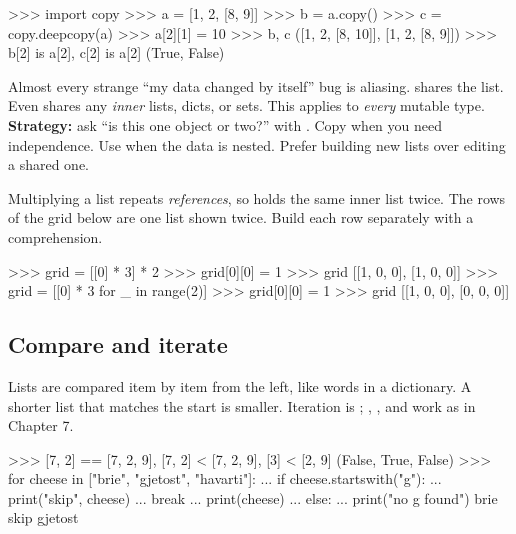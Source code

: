 \begin{pycode}
>>> import copy
>>> a = [1, 2, [8, 9]]
>>> b = a.copy()
>>> c = copy.deepcopy(a)
>>> a[2][1] = 10
>>> b, c
([1, 2, [8, 10]], [1, 2, [8, 9]])
>>> b[2] is a[2], c[2] is a[2]
(True, False)
\end{pycode}

\begin{boss}
Almost every strange ``my data changed by itself'' bug is aliasing.  shares the list. Even
 shares any \emph{inner} lists, dicts, or sets. This applies to \emph{every} mutable type.\\[2pt]
\textbf{Strategy:} ask ``is this one object or two?'' with . Copy when you need independence. Use
 when the data is nested. Prefer building new lists over editing a shared one.
\end{boss}

\begin{trap}
Multiplying a list repeats \emph{references}, so  holds the same inner list twice. The rows of the grid below are one list shown twice. Build
each row separately with a comprehension.
\end{trap}

\begin{pycode}
>>> grid = [[0] * 3] * 2
>>> grid[0][0] = 1
>>> grid
[[1, 0, 0], [1, 0, 0]]
>>> grid = [[0] * 3 for _ in range(2)]
>>> grid[0][0] = 1
>>> grid
[[1, 0, 0], [0, 0, 0]]
\end{pycode}

\subsection{Compare and iterate}

Lists are compared item by item from the left, like words in a dictionary. A shorter list that matches
the start is smaller. Iteration is ; , , and 
work as in Chapter 7.

\begin{pycode}
>>> [7, 2] == [7, 2, 9], [7, 2] < [7, 2, 9], [3] < [2, 9]
(False, True, False)
>>> for cheese in ["brie", "gjetost", "havarti"]:
...     if cheese.startswith("g"):
...         print("skip", cheese)
...         break
...     print(cheese)
... else:
...     print("no g found")
brie
skip gjetost
\end{pycode}

